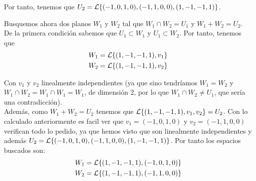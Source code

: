 \documentclass[12pt]{article}
\begin{document}
\begin{ejercicio}
    Por tanto, tenemos que $U_2=\mathcal{L}\{(-1,0,1,0),(-1,1,0,0),(1,-1,-1,1)\}$.\\
    \begin{comment}
    Calculemos ahora las ecuaciones implícitas de $U_1$. Como $U_1$ está generado por un único vector y está en $\bb{R}^4$, tendremos que buscar 3 ecuaciones linealmente independientes. Para ello sabemos que cualquier $(x,y,z,t)\in U_1$ se puede escribir como $\lambda (1,-1,-1,1),\ \lambda \in \bb{R}$.
    Tenemos entonces:
    \begin{gather*}
        \left\{
            \begin{array}{l}
                x=\lambda\\
                y=-\lambda\\
                z=-\lambda\\
                t=\lambda
            \end{array}
        \right. \Rightarrow 
        \left\{
            \begin{array}{l}
                y=-x\\
                z=-x\\
                t=x
            \end{array}
        \right.
    \end{gather*}


    Y tenemos entonces que $U_1=\left\{(x,y,z,t)\in \bb{R}^4 : \begin{array}{l}
        y=-x\\
        z=-x\\
        t=x
    \end{array}\right\}$.\\\\
    \end{comment}

    Busquemos ahora dos planos $W_1$ y $W_2$ tal que $W_1 \cap W_2=U_1$ y $W_1 + W_2=U_2$. 
    De la primera condición sabemos que $U_1\subset W_1$ y $U_1 \subset W_2$. Por tanto, tenemos que 
    \begin{gather*}
        W_1=\mathcal{L}\{(1,-1,-1,1),v_1\}\\
        W_2=\mathcal{L}\{(1,-1,-1,1),v_2\}
    \end{gather*}

    Con $v_1$ y $v_2$ linealmente independientes (ya que sino tendríamos $W_1=W_2$ y $W_1\cap W_2=W_1 \cap W_1=W_1$, de dimensión 2, por lo que $W_1\cap W_2\neq U_1$, que sería una contradicción).\\
    
    Además, como $W_1 + W_2=U_2$ tenemos que $\mathcal{L}\{(1,-1,-1,1),v_1,v_2\}=U_2$. 
    Con lo calculado anteriormente es facil ver que $v_1=(-1,0,1,0)$ y $v_2=(-1,1,0,0)$ verifican todo lo pedido, ya que hemos visto que son linealmente independientes y además $U_2=\mathcal{L}\{(-1,0,1,0),(-1,1,0,0),(1,-1,-1,1)\}$.
    Por tanto los espacios buscados son:
    \begin{gather*}
        W_1=\mathcal{L}\{(1,-1,-1,1),(-1,0,1,0)\}\\
        W_2=\mathcal{L}\{(1,-1,-1,1),(-1,1,0,0)\}
    \end{gather*}

    \end{ejercicio}
\end{document}
